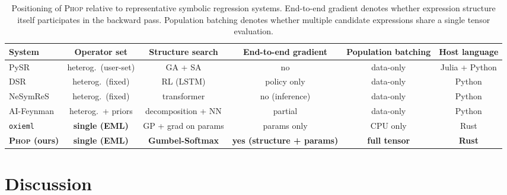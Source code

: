 \documentclass{article}
\begin{document}
\begin{table}[t]
\centering
\small
\begin{tabular}{lccccc}
\toprule
System & Operator set & Structure search & End-to-end gradient & Population batching & Host language\\
\midrule
PySR~\cite{cranmer2023pysr}            & heterog.\ (user-set) & GA + SA      & no  & data-only  & Julia + Python\\
DSR~\cite{petersen2021dsr}             & heterog.\ (fixed)    & RL (LSTM)    & policy only & data-only & Python\\
NeSymReS~\cite{biggio2021nesymres}     & heterog.\ (fixed)    & transformer  & no (inference) & data-only & Python\\
AI-Feynman~\cite{udrescu2020aifeynman2}& heterog.\ + priors   & decomposition + NN & partial & data-only & Python\\
\texttt{oxieml}~\cite{oxieml2026}      & \textbf{single (EML)}& GP + grad on params & params only & CPU only & Rust\\
\textbf{\textsc{Phop} (ours)}          & \textbf{single (EML)}& \textbf{Gumbel-Softmax} & \textbf{yes (structure + params)} & \textbf{full tensor} & \textbf{Rust}\\
\bottomrule
\end{tabular}
\caption{Positioning of \textsc{Phop} relative to representative
symbolic regression systems. End-to-end gradient denotes whether
expression structure itself participates in the backward pass.
Population batching denotes whether multiple candidate expressions
share a single tensor evaluation.}
\label{tab:positioning}
\end{table}


\section{Discussion}
\label{sec:discussion}
\end{document}
